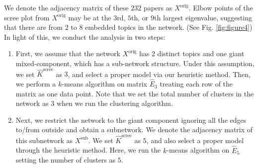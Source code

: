 \documentclass[AMS,STIX1COL]{WileyNJD-v2}
\begin{document}
{We denote the adjacency matrix of these $232$ papers as $X^{\mbox{orig}}$.
Elbow points of the scree plot from $X^{\mbox{orig}}$ may be at the $3$rd, $5$th, or $9$th largest eigenvalue, suggesting that there are from $2$ to $8$ embedded topics in the network. (See Fig. \ref{fig:figure4})
In light of this, we conduct the analysis in two steps:
\begin{enumerate}
    \item First, we assume that the network $X^{\mbox{orig}}$ has $2$ distinct topics and one giant mixed-component, which has a sub-network structure. Under this assumption, we set $\widehat{K}^{\mbox{scree}}$ as $3$, and select a proper model via our heuristic method.
        Then, we perform a $k$-means algorithm on matrix $\widehat{E}_{3}$ treating each row of the matrix as one data point.
        Note that we set the total number of clusters in the network as $3$ when we run the clustering algorithm.
    \item Next, we restrict the network to the giant component ignoring all the edges to/from outside and obtain a subnetwork.
        We denote the adjacency matrix of this subnetwork as $X^{\mbox{sub}}$. We set $\widehat{K}^{\mbox{scree}}$ as $5$, and also select a proper model through the heuristic method.
        Here, we run the $k$-means algorithm on $\widehat{E}_{5}$ setting the number of clusters as $5$.
\end{enumerate}

}
\end{document}
